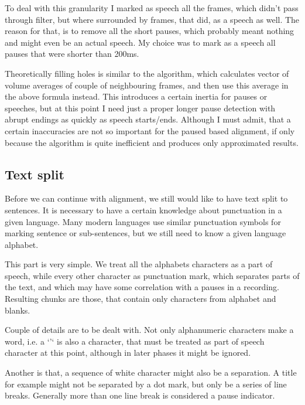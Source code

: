 \documentclass[12pt,a4paper,english]{article}
\begin{document}
To deal with this granularity I marked as speech all the frames, which didn't pass through filter, but where surrounded by frames, that did, as a speech as well.
The reason for that, is to remove all the short pauses, which probably meant nothing and might even be an actual speech. My choice was to mark as a speech all pauses that were shorter than 200ms. \newline

Theoretically filling holes is similar to the algorithm, which calculates vector of volume averages of couple of neighbouring frames, and then use this average in the above formula instead. This introduces a certain inertia for pauses or speeches, but at this point I need just a proper longer pause detection with abrupt endings as quickly as speech starts/ends. Although I must admit, that a certain inaccuracies are not so important for the paused based alignment, if only because the algorithm is quite inefficient and produces only approximated results.

\newpage

\subsection{Text split}

Before we can continue with alignment, we still would like to have text split to sentences. It is necessary to have a certain knowledge about punctuation in a given language.  Many modern languages use similar punctuation symbols for marking sentence or sub-sentences,
but we still need to know a given language alphabet. \newline

This part is very simple. We treat all the alphabets characters as a part of speech, while every other character as punctuation mark, which separates parts of the text, and which may have some correlation with a pauses in a recording. Resulting chunks are those, that contain only characters from alphabet and blanks. \newline

Couple of details are to be dealt with. Not only alphanumeric characters make a word, i.e. a `'` is also a character, that must be treated as part of speech character at this point, although in later phases it might be ignored. \newline

Another is that, a sequence of white character might also be a separation. A title for example might not be separated by a dot mark, but only be a series of line breaks. Generally more than one line break is considered a pause indicator. \newline
\end{document}
